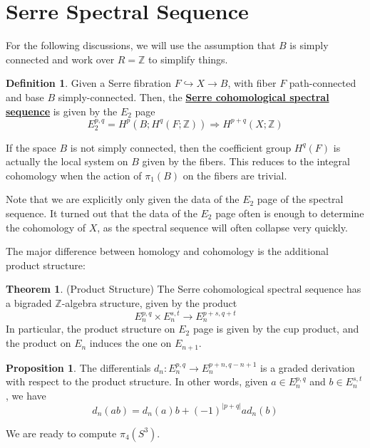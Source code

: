 \documentclass{article}
\theoremstyle{definition}
\newtheorem{theorem}{Theorem}[section]
\theoremstyle{definition}
\theoremstyle{definition}
\newtheorem{proposition}{Proposition}[section]
\theoremstyle{definition}
\theoremstyle{definition}
\newtheorem{definition}{Definition}[section]
\theoremstyle{definition}
\theoremstyle{definition}
\begin{document}
\section{Serre Spectral Sequence}
For the following discussions, we will use the assumption that $B$ is simply connected and work over $R=\mathbb{Z}$ to simplify things. 
\begin{tcolorbox}[colback=purple!5!white,colframe=purple!75!black]
\begin{definition}
Given a Serre fibration $F\hookrightarrow X\to B$, with fiber $F$ path-connected and base $B$ simply-connected. Then, the \underline{\textbf{Serre cohomological spectral sequence}} is given by the $E_2$ page
\[
E_2^{p,q}=H ^{p}(B; H ^{q}(F; \mathbb{Z})) \Longrightarrow H ^{p+q}(X; \mathbb{Z})
\]
\end{definition}
\end{tcolorbox}
If the space $B$ is not simply connected, then the coefficient group $H ^{q}(F)$ is actually the local system on $B$ given by the fibers. This reduces to the integral cohomology when the action of $\pi_1(B)$ on the fibers are trivial.

Note that we are explicitly only given the data of the $E_2$ page of the spectral sequence. It turned out that the data of the $E_2$ page often is enough to determine the cohomology of $X$, as the spectral sequence will often collapse very quickly. 

The major difference between homology and cohomology is the additional product structure:
\begin{tcolorbox}[colback=red!5!white,colframe=red!30!white]
\begin{theorem}
(Product Structure) The Serre cohomological spectral sequence has a bigraded $\mathbb{Z}$-algebra structure, given by the product 
\[
E_n^{p,q}\times E_n^{s,t}\to E_n ^{p+s,q+t}
\]
In particular, the product structure on $E_2$ page is given by the cup product, and the product on $E_n$ induces the one on $E_{n+1}$.
\end{theorem}
\end{tcolorbox}


\begin{tcolorbox}[colback=blue!5!white,colframe=blue!30!white]
\begin{proposition}
    The differentials $d_n: E_n ^{p,q}\to E_n ^{p+n, q-n+1}$ is a graded derivation with respect to the product structure. In other words, given $a\in E_n ^{p,q}$ and $b\in E_n^{s,t}$, we have 
    \[
        d_n(ab)=d_n(a)b+(-1)^{|p+q|}ad_n(b) 
    \]
\end{proposition}
\end{tcolorbox}
We are ready to compute $\pi_4(S^3)$.
\end{document}
